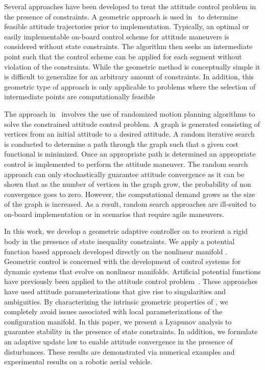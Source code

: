 \documentclass[letterpaper, 10 pt, conference]{ieeeconf}  %
\begin{document}
Several approaches have been developed to treat the attitude control problem in the presence of constraints.
A geometric approach is used in~\cite{hablani1999} to determine feasible attitude trajectories prior to implementation.
Typically, an optimal or easily implementable on-board control scheme for attitude maneuvers is considered without state constraints.
The algorithm then seeks an intermediate point such that the control scheme can be applied for each segment without violation of the constraints.
While the geometric method is conceptually simple it is difficult to generalize for an arbitrary amount of constraints.
In addition, this geometric type of approach is only applicable to problems where the selection of intermediate points are computationally feasible

The approach in~\cite{frazzoli2001} involves the use of randomized motion planning algorithms to solve the constrained attitude control problem.
A graph is generated consisting of vertices from an initial attitude to a desired attitude. 
A random iterative search is conducted to determine a path through the graph such that a given cost functional is minimized.
Once an appropriate path is determined an appropriate control is implemented to perform the attitude maneuver.
The random search approach can only stochastically guarantee attitude convergence as it can be shown that as the number of vertices in the graph grow, the probability of non convergence goes to zero.
However, the computational demand grows as the size of the graph is increased. 
As a result, random search approaches are ill-suited to on-board implementation or in scenarios that require agile maneuvers.

In this work, we develop a geometric adaptive controller on \SO to reorient a rigid body in the presence of state inequality constraints.
We apply a potential function based approach developed directly on the nonlinear manifold \SO.
Geometric control is concerned with the development of control systems for dynamic systems that evolve on nonlinear manifolds.
Artificial potential functions have previously been applied to the attitude control problem~\cite{lee2011b,mcinnes1994}.
These approaches have used attitude parameterizations that give rise to singularities and ambiguities.
By characterizing the intrinsic geometric properties of \SO, we completely avoid issues associated with local parameterizations of the configuration manifold.
In this paper, we present a Lyapunov analysis to guarantee stability in the presence of state constraints.
In addition, we formulate an adaptive update law to enable attitude convergence in the presence of disturbances.
These results are demonstrated via numerical examples and experimental results on a robotic aerial vehicle.
\end{document}
